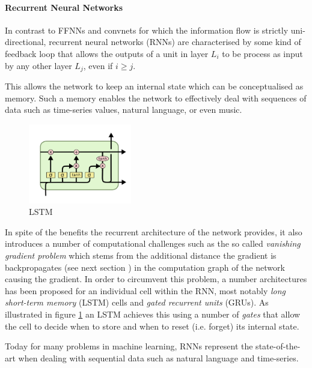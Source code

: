\paragraph{Recurrent Neural Networks} In contrast to FFNNs and convnets for which the information flow is strictly uni-directional, recurrent neural networks (RNNs) are characterised by some kind of feedback loop that allows the outputs of a unit in layer $L_i$ to be process as input by any other layer $L_j$, even if $i \geq j$.

This allows the network to keep an internal state which can be conceptualised as memory. Such a memory enables the network to effectively deal with sequences of data such as time-series values, natural language, or even music. 


\begin{figure}
	\centering
	\includegraphics[width=0.4\textwidth]{figures/chapter-2/lstm.png}
	\caption{LSTM}\label{fig:lstm}   
\end{figure}

In spite of the benefits the recurrent architecture of the network provides, it also introduces a number of computational challenges such as the so called \emph{vanishing gradient problem} which stems from the additional distance the gradient is backpropagates (see next section %
) in the computation graph of the network causing the gradient. In order to circumvent this problem, a number architectures has been proposed for an individual cell within the RNN, most notably \emph{long short-term memory} (LSTM) cells and \emph{gated recurrent units} (GRUs). As illustrated in figure \ref{fig:lstm} an LSTM achieves this using a number of \emph{gates} that allow the cell to decide when to store and when to reset (i.e. forget) its internal state. 

Today for many problems in machine learning, RNNs represent the state-of-the-art when dealing with sequential data such as natural language and time-series. 






